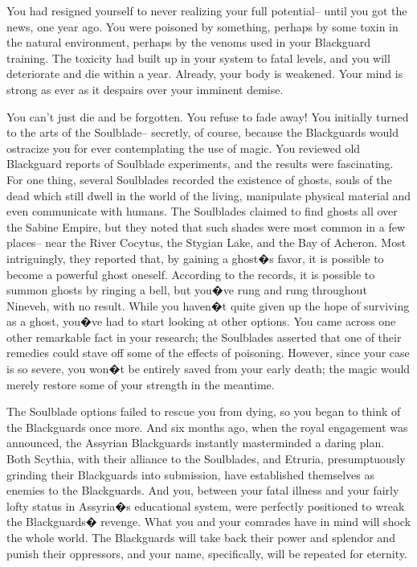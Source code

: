 \documentclass[char]{Kos}
\begin{document}
You had resigned yourself to never realizing your full potential-- until you got the news, one year ago. You were poisoned by something, perhaps by some toxin in the natural environment, perhaps by the venoms used in your Blackguard training. The toxicity had built up in your system to fatal levels, and you will deteriorate and die within a year. Already, your body is weakened. Your mind is strong as ever as it despairs over your imminent demise.

You can't just die and be forgotten. You refuse to fade away! You initially turned to the arts of the Soulblade-- secretly, of course, because the Blackguards would ostracize you for ever contemplating the use of magic. You reviewed old Blackguard reports of Soulblade experiments, and the results were fascinating. For one thing, several Soulblades recorded the existence of ghosts, souls of the dead which still dwell in the world of the living, manipulate physical material and even communicate with humans. The Soulblades claimed to find ghosts all over the Sabine Empire, but they noted that such shades were most common in a few places-- near the River Cocytus, the Stygian Lake, and the Bay of Acheron. Most intriguingly, they reported that, by gaining a ghost�s favor, it is possible to become a powerful ghost oneself. According to the records, it is possible to summon ghosts by ringing a bell, but you�ve rung and rung throughout Nineveh, with no result. While you haven�t quite given up the hope of surviving as a ghost, you�ve had to start looking at other options. You came across one other remarkable fact in your research; the Soulblades asserted that one of their remedies could stave off some of the effects of poisoning. However, since your case is so severe, you won�t be entirely saved from your early death; the magic would merely restore some of your strength in the meantime.

The Soulblade options failed to rescue you from dying, so you began to think of the Blackguards once more. And six months ago, when the royal engagement was announced, the Assyrian Blackguards instantly masterminded a daring plan. Both Scythia, with their alliance to the Soulblades, and Etruria, presumptuously grinding their Blackguards into submission, have established themselves as enemies to the Blackguards. And you, between your fatal illness and your fairly lofty status in Assyria�s educational system, were perfectly positioned to wreak the Blackguards� revenge. What you and your comrades have in mind will shock the whole world. The Blackguards will take back their power and splendor and punish their oppressors, and your name, specifically, will be repeated for eternity. 
\end{document}
